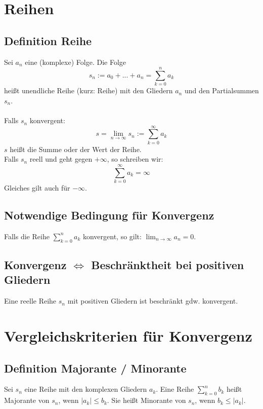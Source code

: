 \documentclass[halfparscip]{scrartcl}
\newcounter{subsection2}
\begin{document}
\newpage
\section{Reihen}
\subsection{Definition Reihe}
Sei $a_n$ eine (komplexe) Folge. Die Folge 
\begin{equation*}
	s_n := a_0 + ... + a_n = \sum_{k=0}^{n}a_k
\end{equation*}
heißt unendliche Reihe (kurz: Reihe) mit den Gliedern $a_n$ und den Partialsummen $s_n$.\\\\
Falls $s_n$ konvergent:
\begin{equation*}
	s = \lim_{n \rightarrow \infty} s_n := \sum_{k=0}^{\infty}a_k
\end{equation*}
$s$ heißt die Summe oder der Wert der Reihe.\\
Falls $s_n$ reell und geht gegen $+\infty$, so schreiben wir:
\begin{equation*}
	\sum_{k=0}^\infty a_k = \infty
\end{equation*}
Gleiches gilt auch für $-\infty$.

\subsection{Notwendige Bedingung für Konvergenz}
Falls die Reihe $\sum_{k=0}^{n}a_k$ konvergent, so gilt: $\lim_{n \rightarrow \infty} a_n = 0$.

\subsection{Konvergenz $\Leftrightarrow$ Beschränktheit bei positiven Gliedern}
Eine reelle Reihe $s_n$ mit positiven Gliedern ist beschränkt gdw. konvergent.

\setcounter{subsection2}{\value{subsection}}
\section*{Vergleichskriterien für Konvergenz}
\setcounter{subsection}{\value{subsection2}}
\subsection{Definition Majorante / Minorante}
Sei $s_n$ eine Reihe mit den komplexen Gliedern $a_k$. Eine Reihe $\sum_{k=0}^{n}b_k$ heißt Majorante von $s_n$, wenn $\vert a_k\vert \leq b_k$. Sie heißt Minorante von $s_n$, wenn $b_k \leq \vert{}a_k\vert$.
\end{document}
